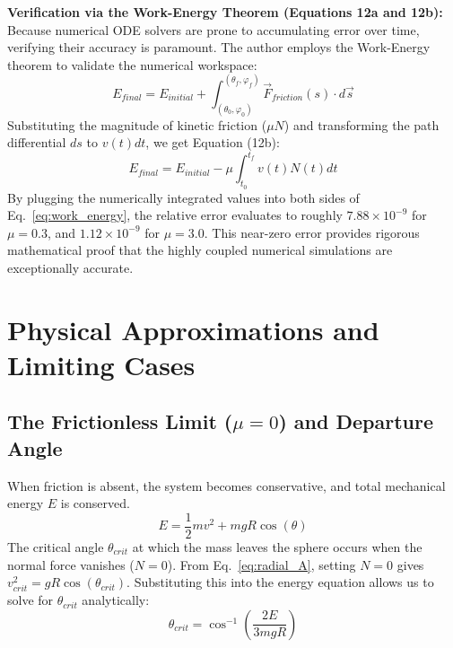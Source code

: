 \documentclass[11pt,letterpaper]{article}
\begin{document}
\begin{physicsinsight}
\textbf{Verification via the Work-Energy Theorem (Equations 12a and 12b):} \\
Because numerical ODE solvers are prone to accumulating error over time, verifying their accuracy is paramount. The author employs the Work-Energy theorem to validate the numerical workspace:
\begin{equation}
E_{final} = E_{initial} + \int_{(\theta_0, \varphi_0)}^{(\theta_f, \varphi_f)} \vec{F}_{friction}(s) \cdot d\vec{s}
\end{equation}
Substituting the magnitude of kinetic friction ($\mu N$) and transforming the path differential $ds$ to $v(t)dt$, we get Equation (12b):
\begin{equation}\label{eq:work_energy}
E_{final} = E_{initial} - \mu \int_{t_0}^{t_f} v(t)N(t)dt
\end{equation}
By plugging the numerically integrated values into both sides of Eq.~\eqref{eq:work_energy}, the relative error evaluates to roughly $7.88 \times 10^{-9}$ for $\mu=0.3$, and $1.12 \times 10^{-9}$ for $\mu=3.0$. This near-zero error provides rigorous mathematical proof that the highly coupled numerical simulations are exceptionally accurate.
\end{physicsinsight}

\section{Physical Approximations and Limiting Cases}

\subsection{The Frictionless Limit ($\mu = 0$) and Departure Angle}
When friction is absent, the system becomes conservative, and total mechanical energy $E$ is conserved. 
\begin{equation}
E = \frac{1}{2}mv^2 + mgR\cos(\theta)
\end{equation}
The critical angle $\theta_{crit}$ at which the mass leaves the sphere occurs when the normal force vanishes ($N = 0$). From Eq.~\eqref{eq:radial_A}, setting $N=0$ gives $v_{crit}^2 = gR\cos(\theta_{crit})$. Substituting this into the energy equation allows us to solve for $\theta_{crit}$ analytically:
\begin{equation}
\theta_{crit} = \cos^{-1}\left(\frac{2E}{3mgR}\right)
\end{equation}
\end{document}
